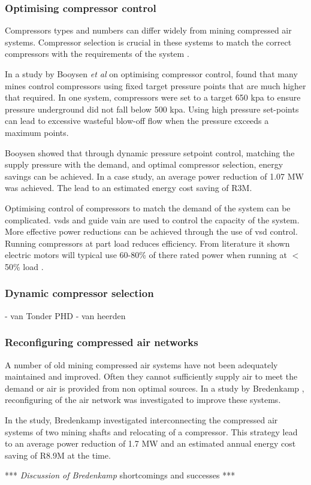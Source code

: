 		\subsubsection{Optimising compressor control}
		Compressors types and numbers can differ widely from mining compressed air systems. Compressor selection is crucial in these systems to match the correct compressors with the requirements of the system \cite{marais2010expert}.
		\par 
		In a study by Booysen \textit{et al} \cite{Booysen2012Masters} on optimising compressor control, \cite{Booysen2012Masters} found that many mines control compressors using fixed target pressure points that are much higher that required. In one system, compressors were set to a target 650 \gls{kpa} to ensure pressure underground did not fall below 500 \gls{kpa}. Using high pressure set-points can lead to excessive wasteful blow-off flow when the pressure exceeds a maximum points.
		\par 
		Booysen \cite{booysen2009optimising} showed that through dynamic pressure setpoint control, matching the supply pressure with the demand, and optimal compressor selection, energy savings can be achieved. In a case study, an average power reduction of 1.07 MW was achieved. The lead to an estimated energy cost saving of R3M.
		\par 
	 	Optimising control of compressors to match the demand of the system can be complicated. \glspl{vsd} and guide vain are used to control the capacity of the system. More effective power reductions can be achieved through the use of \gls{vsd} control. Running compressors at part load reduces efficiency. From literature it shown electric motors will typical use 60-80\% of there rated power when running at $<$50\% load \cite{Saidur2010}.
		
		\subsubsection{Dynamic compressor selection}
		- van Tonder PHD
		- van heerden 
		
		\subsubsection{Reconfiguring compressed air networks}
			A number of old mining compressed air systems  have not been adequately maintained and improved. Often they cannot sufficiently supply air to meet the demand or air is provided from non optimal sources. In a study by Bredenkamp \cite{Bredenkamp2013Masters}, reconfiguring of the air network was investigated to improve these systems.
			\par  
			In the study, Bredenkamp investigated interconnecting the compressed air systems of two mining shafts and relocating of a compressor. This strategy lead to an average power reduction of 1.7 MW and an estimated annual energy cost saving of R8.9M at the time.
			\par 
			*** \textit{Discussion of Bredenkamp} shortcomings and successes ***
			

